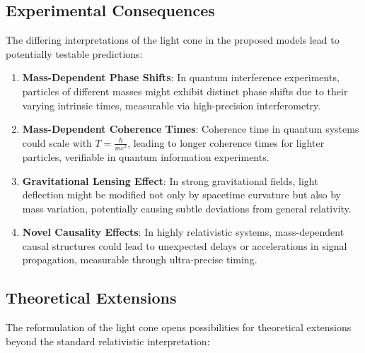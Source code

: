 \documentclass[a4paper,12pt]{article}
\begin{document}
	\subsection{Experimental Consequences}
	The differing interpretations of the light cone in the proposed models lead to potentially testable predictions:
	
	\begin{enumerate}
		\item \textbf{Mass-Dependent Phase Shifts}: In quantum interference experiments, particles of different masses might exhibit distinct phase shifts due to their varying intrinsic times, measurable via high-precision interferometry.
		\item \textbf{Mass-Dependent Coherence Times}: Coherence time in quantum systems could scale with \( T = \frac{\hbar}{m c^2} \), leading to longer coherence times for lighter particles, verifiable in quantum information experiments.
		\item \textbf{Gravitational Lensing Effect}: In strong gravitational fields, light deflection might be modified not only by spacetime curvature but also by mass variation, potentially causing subtle deviations from general relativity.
		\item \textbf{Novel Causality Effects}: In highly relativistic systems, mass-dependent causal structures could lead to unexpected delays or accelerations in signal propagation, measurable through ultra-precise timing.
	\end{enumerate}
	
	\subsection{Theoretical Extensions}
	The reformulation of the light cone opens possibilities for theoretical extensions beyond the standard relativistic interpretation:
	
\end{document}
